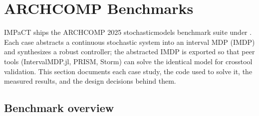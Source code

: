 \documentclass[a4paper,10pt,english]{sphinxmanual}
\begin{document}
\sphinxstepscope


\section{ARCH\sphinxhyphen{}COMP Benchmarks}
\label{\detokenize{benchmarks/index:arch-comp-benchmarks}}\label{\detokenize{benchmarks/index::doc}}
\sphinxAtStartPar
IMPaCT ships the ARCH\sphinxhyphen{}COMP 2025 stochastic\sphinxhyphen{}models benchmark suite under
. Each case abstracts a continuous stochastic system into an
interval MDP (IMDP) and synthesizes a robust controller; the abstracted IMDP is exported
so that peer tools (IntervalMDP.jl, PRISM, Storm) can solve the identical model for
cross\sphinxhyphen{}tool validation. This section documents each case study, the code used to solve
it, the measured results, and the design decisions behind them.


\subsection{Benchmark overview}
\label{\detokenize{benchmarks/index:benchmark-overview}}
\end{document}
